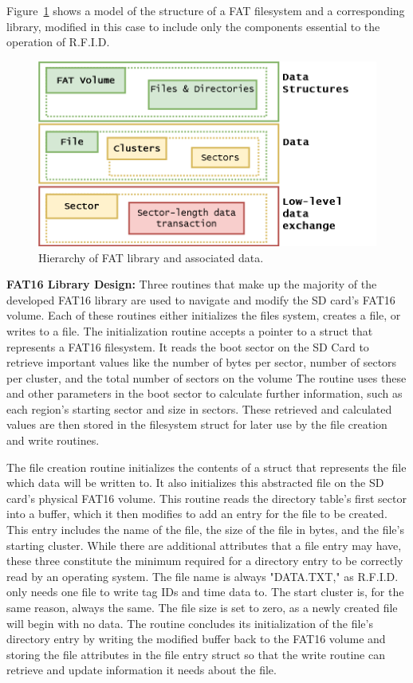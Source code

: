 Figure~\ref{fig:FAT_layers} shows a model of the structure of a FAT filesystem and a corresponding library, modified in this case to include only the components essential to the operation of R.F.I.D.

\begin{figure}[H]
    \centering
    \includegraphics[width=1\textwidth]{Figures/4_details/FAT_layers.png} 
    \caption{Hierarchy of FAT library and associated data.}
    \label{fig:FAT_layers}
\end{figure}

\label{ssss:FAT_design}
\textbf{FAT16 Library Design:}
Three routines that make up the majority of the developed FAT16 library are used to navigate and modify the SD card's FAT16 volume. Each of these routines either initializes the files system, creates a file, or writes to a file. The initialization routine accepts a pointer to a struct that represents a FAT16 filesystem. It reads the boot sector on the SD Card to retrieve important values like the number of bytes per sector, number of sectors per cluster, and the total number of sectors on the volume The routine uses these and other parameters in the boot sector to calculate further information, such as each region's starting sector and size in sectors. These retrieved and calculated values are then stored in the filesystem struct for later use by the file creation and write routines.

The file creation routine initializes the contents of a struct that represents the file which data will be written to. It also initializes this abstracted file on the SD card's physical FAT16 volume. This routine reads the directory table's first sector into a buffer, which it then modifies to add an entry for the file to be created. This entry includes the name of the file, the size of the file in bytes, and the file's starting cluster. While there are additional attributes that a file entry may have, these three constitute the minimum required for a directory entry to be correctly read by an operating system. The file name is always "DATA.TXT," as R.F.I.D. only needs one file to write tag IDs and time data to. The start cluster is, for the same reason, always the same. The file size is set to zero, as a newly created file will begin with no data. The routine concludes its initialization of the file's directory entry by writing the modified buffer back to the FAT16 volume and storing the file attributes in the file entry struct so that the write routine can retrieve and update information it needs about the file.


